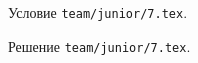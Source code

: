 \problem
Условие \texttt{team/junior/7.tex}.

\solution Решение \texttt{team/junior/7.tex}.
\endproblem
